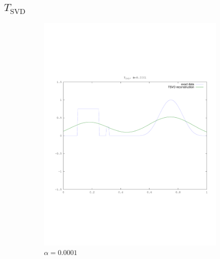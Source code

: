 \documentclass{article}
\begin{document}
\subsection{$T_{\text{SVD}}$}


\begin{figure}[!htb]
        \centering
        \begin{subfigure}[bh]{0.45\textwidth}
                \includegraphics[width=\textwidth]{plots/tsvd0001.pdf}
                \caption{$\alpha=0.0001$}
        \end{subfigure}%
        \begin{subfigure}[bh]{0.45\textwidth}

\end{subfigure}
\end{figure}
\end{document}
